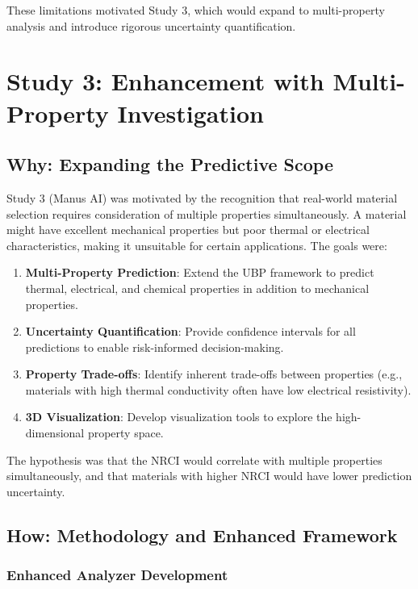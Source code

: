 \documentclass[11pt,a4paper]{article}
\begin{document}
These limitations motivated Study 3, which would expand to multi-property analysis and introduce rigorous uncertainty quantification.

\section{Study 3: Enhancement with Multi-Property Investigation}

\subsection{Why: Expanding the Predictive Scope}

Study 3 (Manus AI) was motivated by the recognition that real-world material selection requires consideration of multiple properties simultaneously. A material might have excellent mechanical properties but poor thermal or electrical characteristics, making it unsuitable for certain applications. The goals were:

\begin{enumerate}
    \item \textbf{Multi-Property Prediction}: Extend the UBP framework to predict thermal, electrical, and chemical properties in addition to mechanical properties.
    
    \item \textbf{Uncertainty Quantification}: Provide confidence intervals for all predictions to enable risk-informed decision-making.
    
    \item \textbf{Property Trade-offs}: Identify inherent trade-offs between properties (e.g., materials with high thermal conductivity often have low electrical resistivity).
    
    \item \textbf{3D Visualization}: Develop visualization tools to explore the high-dimensional property space.
\end{enumerate}

The hypothesis was that the NRCI would correlate with multiple properties simultaneously, and that materials with higher NRCI would have lower prediction uncertainty.

\subsection{How: Methodology and Enhanced Framework}

\subsubsection{Enhanced Analyzer Development}
\end{document}
